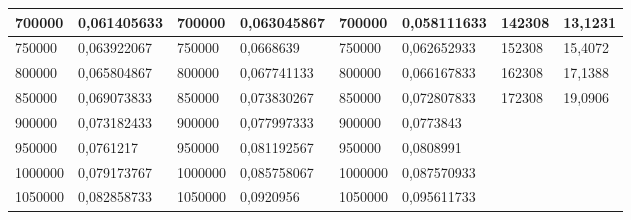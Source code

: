\documentclass[11pt,openany]{book}
\begin{document}
\begin{table}[!ht]
\begin{tabular}{|l|l|l|l|l|l|l|l|}
        700000                                            & 0,061405633                                        & 700000                                              & 0,063045867                                         & 700000          & 0,058111633     & 142308          & 13,1231         \\ \hline
        750000                                            & 0,063922067                                        & 750000                                              & 0,0668639                                           & 750000          & 0,062652933     & 152308          & 15,4072         \\ \hline
        800000                                            & 0,065804867                                        & 800000                                              & 0,067741133                                         & 800000          & 0,066167833     & 162308          & 17,1388         \\ \hline
        850000                                            & 0,069073833                                        & 850000                                              & 0,073830267                                         & 850000          & 0,072807833     & 172308          & 19,0906         \\ \hline
        900000                                            & 0,073182433                                        & 900000                                              & 0,077997333                                         & 900000          & 0,0773843       & ~               & ~               \\ \hline
        950000                                            & 0,0761217                                          & 950000                                              & 0,081192567                                         & 950000          & 0,0808991       & ~               & ~               \\ \hline
        1000000                                           & 0,079173767                                        & 1000000                                             & 0,085758067                                         & 1000000         & 0,087570933     & ~               & ~               \\ \hline
        1050000                                           & 0,082858733                                        & 1050000                                             & 0,0920956                                           & 1050000         & 0,095611733     & ~               & ~               \\ \hline

\end{tabular}
\end{table}
\end{document}
